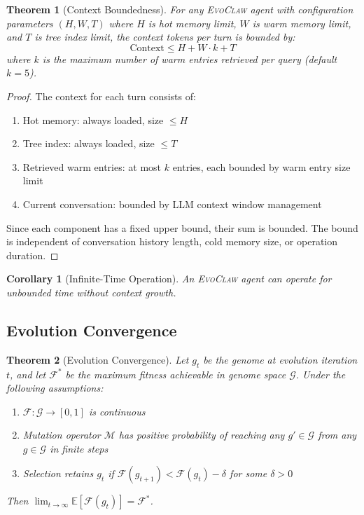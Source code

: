 \documentclass{article}
\newtheorem{theorem}{Theorem}
\newtheorem{corollary}{Corollary}
\newcommand{\evoclaw}{\textsc{EvoClaw}}
\newcommand{\fitnessfn}{\mathcal{F}}
\newcommand{\genomespace}{\mathcal{G}}
\newcommand{\mutation}{\mathcal{M}}
\begin{document}
\begin{theorem}[Context Boundedness]
For any \evoclaw{} agent with configuration parameters $(H, W, T)$ where $H$ is hot memory limit, $W$ is warm memory limit, and $T$ is tree index limit, the context tokens per turn is bounded by:
\begin{equation}
\text{Context} \leq H + W \cdot k + T
\end{equation}
where $k$ is the maximum number of warm entries retrieved per query (default $k=5$).
\end{theorem}

\begin{proof}
The context for each turn consists of:
\begin{enumerate}
    \item Hot memory: always loaded, size $\leq H$
    \item Tree index: always loaded, size $\leq T$
    \item Retrieved warm entries: at most $k$ entries, each bounded by warm entry size limit
    \item Current conversation: bounded by LLM context window management
\end{enumerate}
Since each component has a fixed upper bound, their sum is bounded. The bound is independent of conversation history length, cold memory size, or operation duration.
\end{proof}

\begin{corollary}[Infinite-Time Operation]
An \evoclaw{} agent can operate for unbounded time without context growth.
\end{corollary}

\subsection{Evolution Convergence}

\begin{theorem}[Evolution Convergence]
Let $g_t$ be the genome at evolution iteration $t$, and let $\fitnessfn^*$ be the maximum fitness achievable in genome space $\genomespace$. Under the following assumptions:
\begin{enumerate}
    \item $\fitnessfn: \genomespace \to [0, 1]$ is continuous
    \item Mutation operator $\mutation$ has positive probability of reaching any $g' \in \genomespace$ from any $g \in \genomespace$ in finite steps
    \item Selection retains $g_t$ if $\fitnessfn(g_{t+1}) < \fitnessfn(g_t) - \delta$ for some $\delta > 0$
\end{enumerate}
Then $\lim_{t \to \infty} \mathbb{E}[\fitnessfn(g_t)] = \fitnessfn^*$.
\end{theorem}
\end{document}
